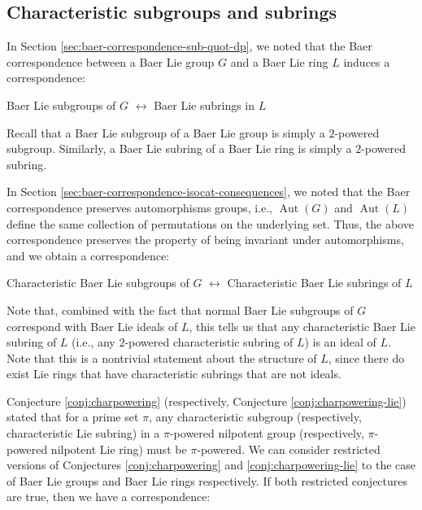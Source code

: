 \subsection{Characteristic subgroups and subrings}\label{sec:baer-correspondence-char-sub}

In Section \ref{sec:baer-correspondence-sub-quot-dp}, we noted that
the Baer correspondence between a Baer Lie group $G$ and a Baer Lie
ring $L$ induces a correspondence:

\begin{center}
  Baer Lie subgroups of $G$ $\leftrightarrow$ Baer Lie subrings in $L$
\end{center}

Recall that a Baer Lie subgroup of a Baer Lie group is simply a
$2$-powered subgroup. Similarly, a Baer Lie subring of a Baer Lie ring
is simply a $2$-powered subring.

In Section \ref{sec:baer-correspondence-isocat-consequences}, we noted
that the Baer correspondence preserves automorphisms groups, i.e.,
$\operatorname{Aut}(G)$ and $\operatorname{Aut}(L)$ define the same
collection of permutations on the underlying set. Thus, the above
correspondence preserves the property of being invariant under
automorphisms, and we obtain a correspondence:

\begin{center}
  Characteristic Baer Lie subgroups of $G$ $\leftrightarrow$
  Characteristic Baer Lie subrings of $L$
\end{center}

Note that, combined with the fact that normal Baer Lie subgroups of
$G$ correspond with Baer Lie ideals of $L$, this tells us that any
characteristic Baer Lie subring of $L$ (i.e., any $2$-powered
characteristic subring of $L$) is an ideal of $L$. Note that this is a
nontrivial statement about the structure of $L$, since there do exist
Lie rings that have characteristic subrings that are not ideals.

Conjecture \ref{conj:charpowering} (respectively, Conjecture
\ref{conj:charpowering-lie}) stated that for a prime set $\pi$, any
characteristic subgroup (respectively, characteristic Lie subring) in
a $\pi$-powered nilpotent group (respectively, $\pi$-powered nilpotent
Lie ring) must be $\pi$-powered. We can consider restricted versions
of Conjectures \ref{conj:charpowering} and \ref{conj:charpowering-lie}
to the case of Baer Lie groups and Baer Lie rings respectively. If
both restricted conjectures are true, then we have a correspondence:

